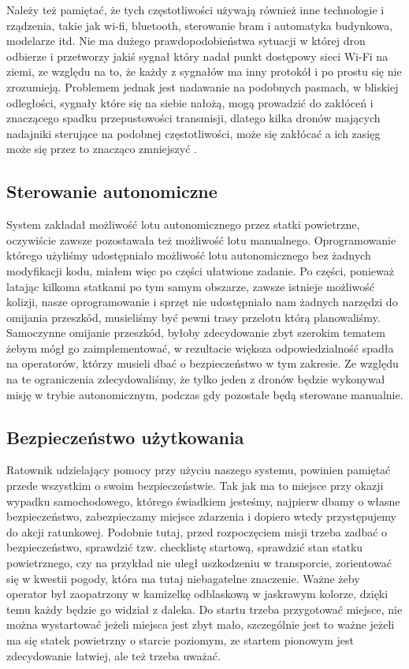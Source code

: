Należy też pamiętać, że tych częstotliwości używają również inne technologie i rządzenia, takie jak wi-fi, bluetooth, sterowanie bram i automatyka budynkowa, modelarze itd. Nie ma dużego prawdopodobieństwa sytuacji w której dron odbierze i przetworzy jakiś sygnał który nadał punkt dostępowy sieci Wi-Fi na ziemi, ze względu na to, że każdy z sygnałów ma inny protokół i po prostu się nie zrozumieją. Problemem jednak jest nadawanie na podobnych pasmach, w bliskiej odległości, sygnały które się na siebie nałożą, mogą prowadzić do zakłóceń i znaczącego spadku przepustowości transmisji, dlatego kilka dronów mających nadajniki sterujące na podobnej częstotliwości, może się zakłócać a ich zasięg może się przez to znacząco zmniejszyć \cite{radiointerference}.

\subsection{Sterowanie autonomiczne}

System zakładał możliwość lotu autonomicznego przez statki powietrzne, oczywiście zawsze pozostawała też możliwość lotu manualnego. Oprogramowanie którego użyliśmy udostępniało możliwość lotu autonomicznego bez żadnych modyfikacji kodu, miałem więc po części ułatwione zadanie. Po części, ponieważ latając kilkoma statkami po tym samym obszarze, zawsze istnieje możliwość kolizji, nasze oprogramowanie i sprzęt nie udostępniało nam żadnych narzędzi do omijania przeszkód, musieliśmy być pewni trasy przelotu którą planowaliśmy. Samoczynne omijanie przeszkód, byłoby zdecydowanie zbyt szerokim tematem żebym mógł go zaimplementować, w rezultacie większa odpowiedzialność spadła na operatorów, którzy musieli dbać o bezpieczeństwo w tym zakresie. Ze względu na te ograniczenia zdecydowaliśmy, że tylko jeden z dronów będzie wykonywał misję w trybie autonomicznym, podczas gdy pozostałe będą sterowane manualnie.

\subsection{Bezpieczeństwo użytkowania}

Ratownik udzielający pomocy przy użyciu naszego systemu, powinien pamiętać przede wszystkim o swoim bezpieczeństwie. Tak jak ma to miejsce przy okazji wypadku samochodowego, którego świadkiem jesteśmy, najpierw dbamy o własne bezpieczeństwo, zabezpieczamy miejsce zdarzenia i dopiero wtedy przystępujemy do akcji ratunkowej. Podobnie tutaj, przed rozpoczęciem misji trzeba zadbać o bezpieczeństwo, sprawdzić tzw. checklistę startową, sprawdzić stan statku powietrznego, czy na przykład nie uległ uszkodzeniu w transporcie, zorientować się w kwestii pogody, która ma tutaj niebagatelne znaczenie. Ważne żeby operator był zaopatrzony w kamizelkę odblaskową w jaskrawym kolorze, dzięki temu każdy będzie go widział z daleka. Do startu trzeba przygotować miejsce, nie można wystartować jeżeli miejsca jest zbyt mało, szczególnie jest to ważne jeżeli ma się statek powietrzny o starcie poziomym, ze startem pionowym jest zdecydowanie łatwiej, ale też trzeba uważać. 

